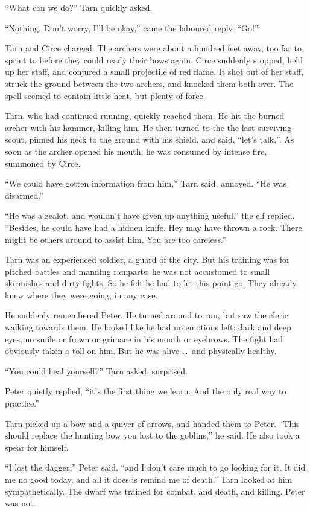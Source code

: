 ``What can we do?'' Tarn quickly asked.

``Nothing.  Don't worry, I'll be okay,'' came the laboured reply.  ``Go!''

Tarn and Circe charged.  The archers were about a hundred feet away, too far to sprint to before they could ready their bows again.  Circe suddenly stopped, held up her staff, and conjured a small projectile of red flame.  It shot out of her staff, struck the ground between the two archers, and knocked them both over.  The spell seemed to contain little heat, but plenty of force.

Tarn, who had continued running, quickly reached them.  He hit the burned archer with his hammer, killing him.  He then turned to the the last surviving scout, pinned his neck to the ground with his shield, and said, ``let's talk,''.  As soon as the archer opened his mouth, he was consumed by intense fire, summoned by Circe.

``We could have gotten information from him,'' Tarn said, annoyed.  ``He was disarmed.''

``He was a zealot, and wouldn't have given up anything useful.''  the elf replied.  ``Besides, he could have had a hidden knife.  Hey may have thrown a rock.  There might be others around to assist him.  You are too careless.''

Tarn was an experienced soldier, a guard of the city.  But his training was for pitched battles and manning ramparts; he was not accustomed to small skirmishes and dirty fights.  So he felt he had to let this point go.  They already knew where they were going, in any case.

He suddenly remembered Peter.  He turned around to run, but saw the cleric walking towards them.  He looked like he had no emotions left: dark and deep eyes, no smile or frown or grimace in his mouth or eyebrows.  The fight had obviously taken a toll on him.  But he was alive \ldots\ and physically healthy.

``You could heal yourself?'' Tarn asked, surprised.

Peter quietly replied, ``it's the first thing we learn.  And the only real way to practice.''

Tarn picked up a bow and a quiver of arrows, and handed them to Peter.  ``This should replace the hunting bow you lost to the goblins,'' he said.  He also took a spear for himself.

``I lost the dagger,'' Peter said, ``and I don't care much to go looking for it.  It did me no good today, and all it does is remind me of death.''  Tarn looked at him sympathetically.  The dwarf was trained for combat, and death, and killing.  Peter was not.




